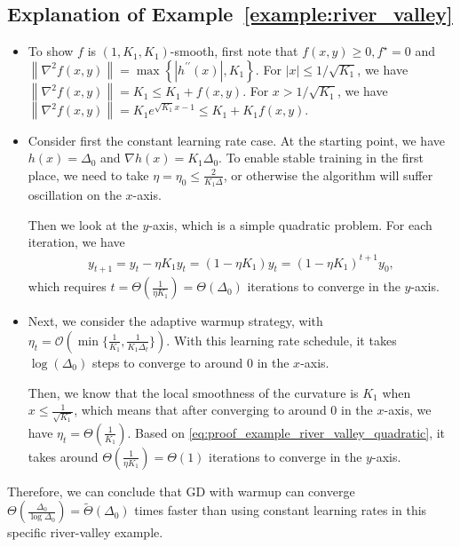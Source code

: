 \documentclass{article}
\newcommand{\cO}{\mathcal{O}}
\begin{document}
\subsection{Explanation of Example~\ref{example:river_valley}}\label{apx:proof_example_river_valley}
\begin{itemize}[leftmargin=*]
\item 
{
To show $f$ is $\left(1, K_1, K_1\right)$-smooth, first note that $f(x, y) \geq 0, f^{\star}=0$ and 
$\left\|\nabla^2 f(x, y)\right\|=\max \left\{\left|h^{\prime \prime}(x)\right|, K_1\right\}$. 
For $|x| \leq 1 / \sqrt{K_1}$, 
we have $\left\|\nabla^2 f(x, y)\right\|=K_1 \leq K_1+f(x, y)$.
For $x>1 / \sqrt{K_1}$, we have $\left\|\nabla^2 f(x, y)\right\|=K_1 e^{\sqrt{K_1} x-1} \leq K_1+K_1 f(x, y)$.}
\item Consider first the constant learning rate case. At the starting point, we have $h(x) = \Delta_0$ and $\nabla h(x) = K_1 \Delta_0$. To enable stable training in the first place, we need to take $\eta = \eta_0 \le \frac{2}{K_1 \Delta}$, or otherwise the algorithm will suffer oscillation on the $x$-axis. 

Then we look at the $y$-axis, which is a simple quadratic problem. For each iteration, we have
\begin{align}\label{eq:proof_example_river_valley_quadratic}
    y_{t+1} = y_t - \eta K_1 y_t = (1 - \eta K_1) y_t = (1-\eta K_1 )^{t+1}y_0 ,
\end{align}
which requires $t = \Theta(\frac{1}{\eta K_1}) = \Theta(\Delta_0)$ iterations to converge in the $y$-axis.

\item Next, we consider the adaptive warmup strategy, with $\eta_t = \cO\left( \min\{ \frac{1}{K_1}, \frac{1}{K_1 \Delta_t} \} \right)$. With this learning rate schedule, it takes $\log(\Delta_0)$ steps to converge to around $0$ in the $x$-axis. 

Then, we know that the local smoothness of the curvature is $K_1$ when $x \le \frac{1}{\sqrt{K_1}}$, which means that after converging to around $0$ in the $x$-axis, we have $\eta_t = \Theta(\frac{1}{K_1})$. Based on \eqref{eq:proof_example_river_valley_quadratic}, it takes around $\Theta(\frac{1}{\eta K_1}) = \Theta(1)$ iterations to converge in the $y$-axis. 

\end{itemize}
Therefore, we can conclude that GD with warmup can converge $\Theta(\frac{\Delta_0}{\log \Delta_0}) = \tilde{\Theta}(\Delta_0)$ times faster than using constant learning rates in this specific river-valley example.
\end{document}
